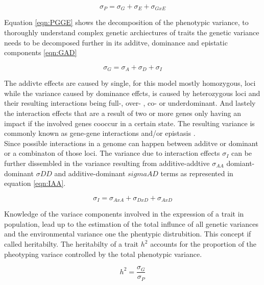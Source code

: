 \begin{equation}
  \sigma_{P} = \sigma_{G} + \sigma_{E} + \sigma_{GxE}
  \label{eqn:PGGE}
\end{equation}


Equation \ref{eqn:PGGE} shows the decomposition of the phenotypic variance, to thoroughly understand complex genetic archiectures of traits
the genetic variance needs to be decomposed further in its additve, dominance and epistatic components \ref{eqn:GAD}

\begin{equation}
  \sigma_{G} = \sigma_{A} + \sigma_{D} + \sigma_{I}
  \label{eqn:GAD}
\end{equation}

The addivte effects are caused by single, for this model mostly homozygous, loci while the variance caused by dominance effcts, is caused by
heterozygous loci and their resulting interactions being full-, over- , co- or underdominant. And lastely the interaction effects  that are a
result of two or more genes only having an impact if the involved genes cooccur in a certain state. The resulting variance is commonly known
as gene-gene interactions and/or epistasis \cite{falconer1996}. \\
Since possible interactions in a genome can happen between additve or dominant or a combinaton of those loci. The variance due to interaction
effects $\sigma_{I}$ can be further dissembled in the variance resulting from additive-addtive $\sigma_{AA}$ domiant-dominant $\sigma{DD}$ and
additive-dominant $sigma{AD}$ terms as represented in equation \ref{eqn:IAA}.


\begin{equation}
  \sigma_{I} = \sigma_{AxA} + \sigma_{DxD} + \sigma_{AxD}
  \label{eqn:IAA}
\end{equation}

Knowledge of the variace components involved in the expression of a trait in population, lead up to the estimation of the total influnce
of all genetic variances and the environmental variance one the phentypic distrubition. This concept if called heritabilty.
The heritabilty of a trait $h^2$ accounts for the proportion of the pheotyping variace controlled by the total phenotypic variance.




\begin{equation}
  h^2 = \frac{\sigma_{G}}{\sigma_{P}}
  \label{eqn:h2G}
\end{equation}


